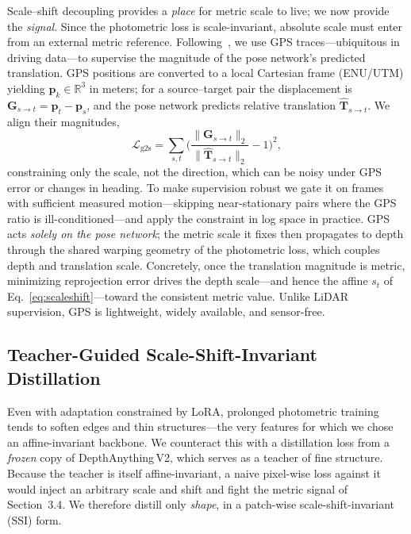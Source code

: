 Scale--shift decoupling provides a \emph{place} for metric scale to live; we now provide the \emph{signal}. Since the photometric loss is scale-invariant, absolute scale must enter from an external metric reference. Following~\cite{chawla2021multimodal}, we use GPS traces---ubiquitous in driving data---to supervise the magnitude of the pose network's predicted translation. GPS positions are converted to a local Cartesian frame (ENU/UTM) yielding \(\mathbf{p}_k \in \mathbb{R}^3\) in meters; for a source--target pair the displacement is \(\mathbf{G}_{s \to t} = \mathbf{p}_t - \mathbf{p}_s\), and the pose network predicts relative translation \(\hat{\mathbf{T}}_{s \to t}\). We align their magnitudes,
\begin{equation}
\mathcal{L}_{\mathrm{g2s}}
=
\sum_{s,t}
\Bigg(
\frac{\lVert \mathbf{G}_{s\!\rightarrow t}\rVert_2}
     {\lVert \hat{\mathbf{T}}_{s\!\rightarrow t}\rVert_2}
-1
\Bigg)^{\!2},
\label{eq:gps_scale_loss}
\end{equation}
constraining only the scale, not the direction, which can be noisy under GPS error or changes in heading. To make supervision robust we gate it on frames with sufficient measured motion---skipping near-stationary pairs where the GPS ratio is ill-conditioned---and apply the constraint in log space in practice. GPS acts \emph{solely on the pose network}; the metric scale it fixes then propagates to depth through the shared warping geometry of the photometric loss, which couples depth and translation scale. Concretely, once the translation magnitude is metric, minimizing reprojection error drives the depth scale---and hence the affine \(s_t\) of Eq.~\eqref{eq:scaleshift}---toward the consistent metric value. Unlike LiDAR supervision, GPS is lightweight, widely available, and sensor-free.

\subsection{Teacher-Guided Scale-Shift-Invariant Distillation}

Even with adaptation constrained by LoRA, prolonged photometric training tends to soften edges and thin structures---the very features for which we chose an affine-invariant backbone. We counteract this with a distillation loss from a \emph{frozen} copy of DepthAnything\,V2, which serves as a teacher of fine structure. Because the teacher is itself affine-invariant, a naive pixel-wise loss against it would inject an arbitrary scale and shift and fight the metric signal of Section~3.4. We therefore distill only \emph{shape}, in a patch-wise scale-shift-invariant (SSI) form.

